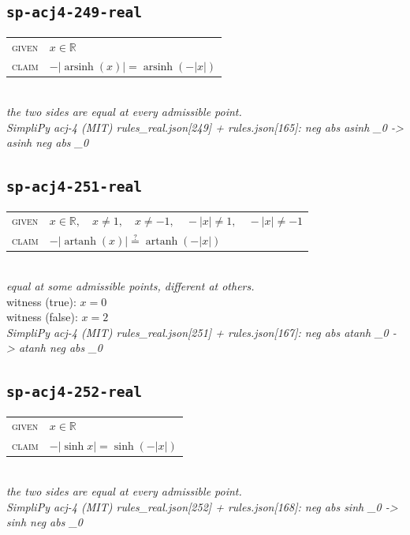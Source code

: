 \documentclass[11pt]{article}
\begin{document}
\subsection*{\texttt{sp-acj4-249-real}}
\begin{tabular}{@{}l@{\quad}l@{}}
\textsc{given} & $x \in \mathbb{R}$ \\[4pt]
\textsc{claim} & $\displaystyle -\left|\operatorname{arsinh}\left(x\right)\right| = \operatorname{arsinh}\left(-\left|x\right|\right)$ \\
\end{tabular}\\[2pt]
{\small\emph{the two sides are equal at every admissible point.}}\\
\emph{SimpliPy acj-4 (MIT) rules\_real.json[249] + rules.json[165]: neg abs asinh \_0  ->  asinh neg abs \_0}\\

\subsection*{\texttt{sp-acj4-251-real}}
\begin{tabular}{@{}l@{\quad}l@{}}
\textsc{given} & $x \in \mathbb{R},\quad x \neq 1,\quad x \neq -1,\quad -\left|x\right| \neq 1,\quad -\left|x\right| \neq -1$ \\[4pt]
\textsc{claim} & $\displaystyle -\left|\operatorname{artanh}\left(x\right)\right| \overset{?}{=} \operatorname{artanh}\left(-\left|x\right|\right)$ \\
\end{tabular}\\[2pt]
{\small\emph{equal at some admissible points, different at others.}}\\
{\footnotesize\color{gray}witness (true): $x = 0$}\\
{\footnotesize\color{gray}witness (false): $x = 2$}\\
\emph{SimpliPy acj-4 (MIT) rules\_real.json[251] + rules.json[167]: neg abs atanh \_0  ->  atanh neg abs \_0}\\

\subsection*{\texttt{sp-acj4-252-real}}
\begin{tabular}{@{}l@{\quad}l@{}}
\textsc{given} & $x \in \mathbb{R}$ \\[4pt]
\textsc{claim} & $\displaystyle -\left|\sinh x\right| = \sinh\left(-\left|x\right|\right)$ \\
\end{tabular}\\[2pt]
{\small\emph{the two sides are equal at every admissible point.}}\\
\emph{SimpliPy acj-4 (MIT) rules\_real.json[252] + rules.json[168]: neg abs sinh \_0  ->  sinh neg abs \_0}\\
\end{document}
